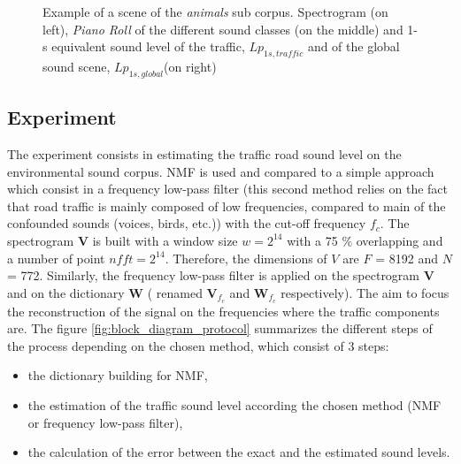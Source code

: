 \documentclass[twocolumn,a4paper,10pt]{article}
\begin{document}
\begin{figure}
\begin{minipage}[c]{.32\linewidth}
   \end{minipage}
\caption{Example of a scene of the \textit{animals} sub corpus. Spectrogram (on left), \textit{Piano Roll} of the different sound classes (on the middle) and 1-s equivalent sound level of the traffic, $Lp_{1s,traffic}$ and of the global sound scene, $Lp_{1s,global}$(on right)}
\label{fig:exampleScene}
\end{figure}

\subsection{Experiment}

The experiment consists in estimating the traffic road sound level on the environmental sound corpus. NMF is used and compared to a simple approach which consist in a frequency low-pass filter (this second method relies on the fact that road traffic is mainly composed of low frequencies, compared to main of the confounded sounds (voices, birds, etc.)) with the cut-off frequency $f_c$. The spectrogram $\mathbf{V}$ is built with a window size $w = 2^{14}$ with a 75 $\%$ overlapping and a number of point $nfft = 2^{14}$. Therefore, the dimensions of $V$ are $F$ = 8192 and $N$ = 772.  Similarly, the frequency low-pass filter is applied on the spectrogram $\mathbf{V}$ and on the dictionary $\mathbf{W}$ ( renamed $\mathbf{V}_{f_c}$ and $\mathbf{W}_{f_c}$ respectively). The aim to focus the reconstruction of the signal on the frequencies where the traffic components are. The figure \ref{fig:block_diagram_protocol} summarizes the different steps of the process depending on the chosen method, which consist of 3 steps:

\begin{itemize}
\item the dictionary building for NMF,
\item the estimation of the traffic sound level according the chosen method (NMF or frequency low-pass filter),
\item the calculation of the error between the exact and the estimated sound levels.\\
\end{itemize}
\end{document}
